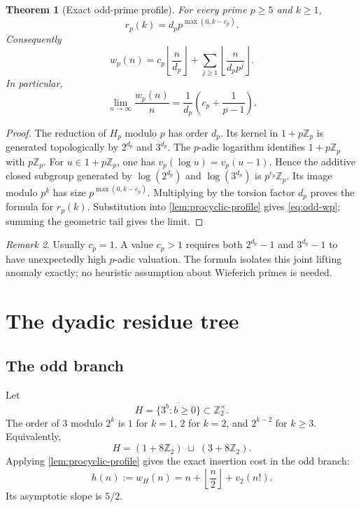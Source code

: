 \documentclass[11pt]{article}
\newtheorem{theorem}{Theorem}[section]
\theoremstyle{definition}
\theoremstyle{remark}
\newtheorem{remark}[theorem]{Remark}
\newcommand{\Z}{\mathbb Z}
\newcommand{\floor}[1]{\left\lfloor #1\right\rfloor}
\begin{document}
\begin{theorem}[Exact odd-prime profile]\label{thm:odd-profile}
For every prime $p\ge5$ and $k\ge1$,
\[
       r_p(k)=d_p p^{\max(0,k-c_p)}.
\]
Consequently
\begin{equation}\label{eq:odd-wp}
 w_p(n)=c_p\floor{\frac n{d_p}}
       +\sum_{j\ge1}\floor{\frac n{d_p p^j}}.
\end{equation}
In particular,
\[
       \lim_{n\to\infty}\frac{w_p(n)}n
       =\frac1{d_p}\left(c_p+\frac1{p-1}\right).
\]
\end{theorem}
\begin{proof}
The reduction of $H_p$ modulo $p$ has order $d_p$.  Its kernel in $1+p\Z_p$ is generated topologically by $2^{d_p}$ and $3^{d_p}$.  The $p$-adic logarithm identifies $1+p\Z_p$ with $p\Z_p$.  For $u\in1+p\Z_p$, one has $v_p(\log u)=v_p(u-1)$.  Hence the additive closed subgroup generated by
$\log(2^{d_p})$ and $\log(3^{d_p})$ is $p^{c_p}\Z_p$.  Its image modulo $p^k$ has size $p^{\max(0,k-c_p)}$.  Multiplying by the torsion factor $d_p$ proves the formula for $r_p(k)$.  Substitution into \cref{lem:procyclic-profile} gives \eqref{eq:odd-wp}; summing the geometric tail gives the limit.
\end{proof}

\begin{remark}
Usually $c_p=1$.  A value $c_p>1$ requires both $2^{d_p}-1$ and $3^{d_p}-1$ to have unexpectedly high $p$-adic valuation.  The formula isolates this joint lifting anomaly exactly; no heuristic assumption about Wieferich primes is needed.
\end{remark}

\section{The dyadic residue tree}

\subsection{The odd branch}
Let
\[
       H=\overline{\{3^b:b\ge0\}}\subset\Z_2^\times.
\]
The order of $3$ modulo $2^k$ is $1$ for $k=1$, $2$ for $k=2$, and $2^{k-2}$ for $k\ge3$.  Equivalently,
\[
       H=(1+8\Z_2)\;\sqcup\;(3+8\Z_2).
\]
Applying \cref{lem:procyclic-profile} gives the exact insertion cost in the odd branch:
\begin{equation}\label{eq:h2}
       h(n):=w_H(n)
       =n+\floor{\frac n2}+v_2(n!).
\end{equation}
Its asymptotic slope is $5/2$.
\end{document}
